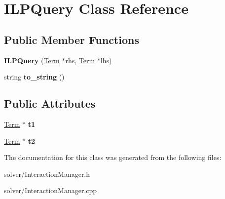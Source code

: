 \hypertarget{classILPQuery}{\section{\-I\-L\-P\-Query \-Class \-Reference}
\label{classILPQuery}
}
\subsection*{\-Public \-Member \-Functions}
\begin{DoxyCompactItemize}
\item 
\hypertarget{classILPQuery_a6e1f24a8f3c18f0ec9f174e3e675a7d5}{{\bfseries \-I\-L\-P\-Query} (\hyperlink{classTerm}{\-Term} $\ast$rhs, \hyperlink{classTerm}{\-Term} $\ast$lhs)}\label{classILPQuery_a6e1f24a8f3c18f0ec9f174e3e675a7d5}

\item 
\hypertarget{classILPQuery_abbcb314b455ec2954fbe25915d1c50c4}{string {\bfseries to\-\_\-string} ()}\label{classILPQuery_abbcb314b455ec2954fbe25915d1c50c4}

\end{DoxyCompactItemize}
\subsection*{\-Public \-Attributes}
\begin{DoxyCompactItemize}
\item 
\hypertarget{classILPQuery_aa6d087d78bb93e1ad5ab6c1dda0ee56d}{\hyperlink{classTerm}{\-Term} $\ast$ {\bfseries t1}}\label{classILPQuery_aa6d087d78bb93e1ad5ab6c1dda0ee56d}

\item 
\hypertarget{classILPQuery_a5360d1ed1edda5715ef417bde6bf31dd}{\hyperlink{classTerm}{\-Term} $\ast$ {\bfseries t2}}\label{classILPQuery_a5360d1ed1edda5715ef417bde6bf31dd}

\end{DoxyCompactItemize}


\-The documentation for this class was generated from the following files\-:\begin{DoxyCompactItemize}
\item 
solver/\-Interaction\-Manager.\-h\item 
solver/\-Interaction\-Manager.\-cpp\end{DoxyCompactItemize}
